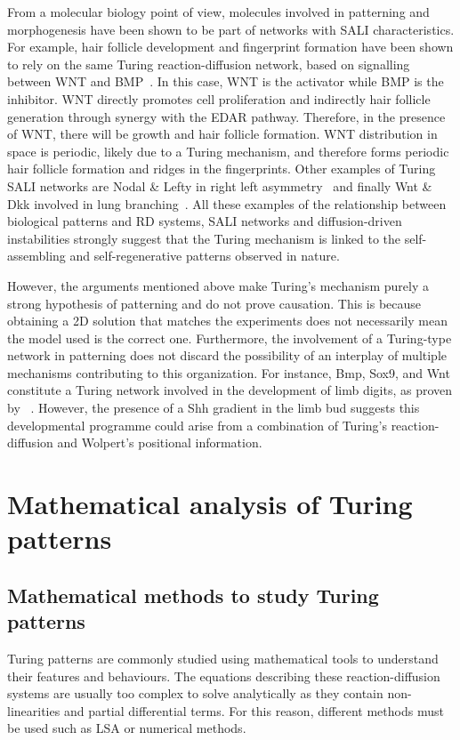 From a molecular biology point of view, molecules involved in patterning and morphogenesis have been shown to be part of networks with SALI characteristics.
For example, hair follicle development and fingerprint formation have been shown to rely on the same Turing reaction-diffusion network, based on signalling between WNT and BMP~\parencite{Glover2023}.
In this case, WNT is the activator while BMP is the inhibitor.
WNT directly promotes cell proliferation and indirectly hair follicle generation through synergy with the EDAR pathway.
Therefore, in the presence of WNT, there will be growth and hair follicle formation.
WNT distribution in space is periodic, likely due to a Turing mechanism, and therefore forms periodic hair follicle formation and ridges in the fingerprints.
Other examples of Turing SALI networks are Nodal \& Lefty in right left asymmetry~\parencite{Nakamura2006} and finally Wnt \& Dkk involved in lung branching~\parencite{langhe2005_lung}.
All these examples of the relationship between biological patterns and RD systems, SALI networks and diffusion-driven instabilities strongly suggest that the Turing mechanism is linked to the self-assembling and self-regenerative patterns observed in nature.

However, the arguments mentioned above make Turing’s mechanism purely a strong hypothesis of patterning and do not prove causation.
This is because obtaining a 2D solution that matches the experiments does not necessarily mean the model used is the correct one.
Furthermore, the involvement of a Turing-type network in patterning does not discard the possibility of an interplay of multiple mechanisms contributing to this organization.
For instance, Bmp, Sox9, and Wnt constitute a Turing network involved in the development of limb digits, as proven by ~\cite{Raspopovic1}.
However, the presence of a Shh gradient in the limb bud suggests this developmental programme could arise from a combination of Turing's reaction-diffusion and Wolpert's positional information.


\section{Mathematical analysis of Turing patterns}

\subsection{Mathematical methods to study Turing patterns}
Turing patterns are commonly studied using mathematical tools to understand their features and behaviours.
The equations describing these reaction-diffusion systems are usually too complex to solve analytically as they contain non-linearities and partial differential terms.
For this reason, different methods must be used such as \acrfull{LSA} or numerical methods.

